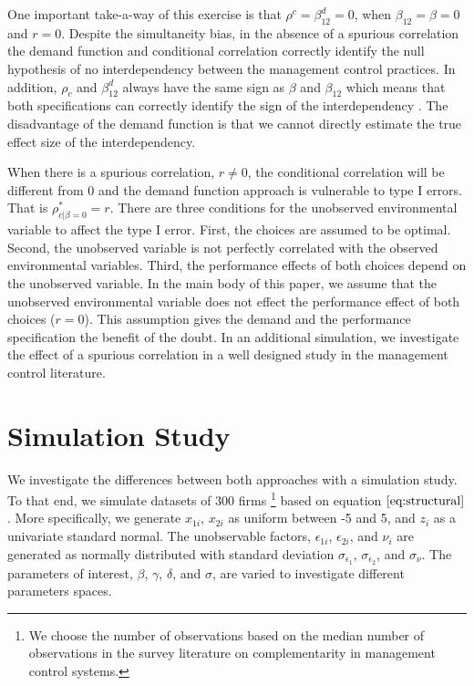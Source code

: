 \documentclass[12pt]{article}
\begin{document}
One important take-a-way of this exercise is that
\(\rho^c = \beta^d_{12} = 0\), when \(\beta_{12} = \beta = 0\) and
\(r = 0\). Despite the simultaneity bias, in the absence of a spurious
correlation the demand function and conditional correlation correctly
identify the null hypothesis of no interdependency between the
management control practices. In addition, \(\rho_c\) and
\(\beta^d_{12}\) always have the same sign as \(\beta\) and
\(\beta_{12}\) which means that both specifications can correctly
identify the sign of the interdependency \citep{Arora1996}. The
disadvantage of the demand function is that we cannot directly estimate
the true effect size of the interdependency.

When there is a spurious correlation, \(r \neq 0\), the conditional
correlation will be different from 0 and the demand function approach is
vulnerable to type I errors. That is \(\rho^*_{c|\beta=0} = r\). There
are three conditions for the unobserved environmental variable to affect
the type I error. First, the choices are assumed to be optimal. Second,
the unobserved variable is not perfectly correlated with the observed
environmental variables. Third, the performance effects of both choices
depend on the unobserved variable. In the main body of this paper, we
assume that the unobserved environmental variable does not effect the
performance effect of both choices (\(r = 0\)). This assumption gives
the demand and the performance specification the benefit of the doubt.
In an additional simulation, we investigate the effect of a spurious
correlation in a well designed study in the management control
literature.

\section{Simulation Study}\label{simulation-study}

We investigate the differences between both approaches with a simulation
study. To that end, we simulate datasets of 300 firms \footnote{We
  choose the number of observations based on the median number of
  observations in the survey literature on complementarity in management
  control systems.} based on equation \(\eqref{eq:structural}\). More
specifically, we generate \(x_{1i}\), \(x_{2i}\) as uniform between -5
and 5, and \(z_i\) as a univariate standard normal. The unobservable
factors, \(\epsilon_{1i}\), \(\epsilon_{2i}\), and \(\nu_i\) are
generated as normally distributed with standard deviation
\(\sigma_{\epsilon_1}\), \(\sigma_{\epsilon_2}\), and \(\sigma_{\nu}\).
The parameters of interest, \(\beta\), \(\gamma\), \(\delta\), and
\(\sigma\), are varied to investigate different parameters spaces.
\end{document}
